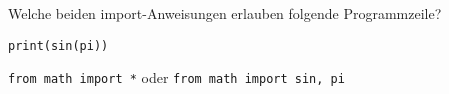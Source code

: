 \question[2]  Welche beiden import-Anweisungen erlauben folgende Programmzeile?

\texttt{print(sin(pi))}
\begin{solutionbox}{1cm}
\texttt{from math import *}   oder  \texttt{from math import sin, pi}
\end{solutionbox}
